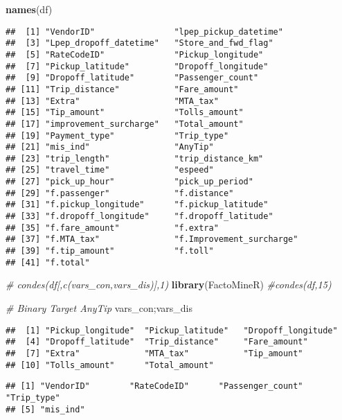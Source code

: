\documentclass[]{article}
\newenvironment{Shaded}{\begin{snugshade}}{\end{snugshade}}
\newcommand{\KeywordTok}[1]{\textcolor[rgb]{0.13,0.29,0.53}{\textbf{{#1}}}}
\newcommand{\CommentTok}[1]{\textcolor[rgb]{0.56,0.35,0.01}{\textit{{#1}}}}
\newcommand{\NormalTok}[1]{{#1}}
\begin{document}
\begin{Shaded}
\begin{Highlighting}[]
\KeywordTok{names}\NormalTok{(df)}
\end{Highlighting}
\end{Shaded}

\begin{verbatim}
##  [1] "VendorID"                "lpep_pickup_datetime"   
##  [3] "Lpep_dropoff_datetime"   "Store_and_fwd_flag"     
##  [5] "RateCodeID"              "Pickup_longitude"       
##  [7] "Pickup_latitude"         "Dropoff_longitude"      
##  [9] "Dropoff_latitude"        "Passenger_count"        
## [11] "Trip_distance"           "Fare_amount"            
## [13] "Extra"                   "MTA_tax"                
## [15] "Tip_amount"              "Tolls_amount"           
## [17] "improvement_surcharge"   "Total_amount"           
## [19] "Payment_type"            "Trip_type"              
## [21] "mis_ind"                 "AnyTip"                 
## [23] "trip_length"             "trip_distance_km"       
## [25] "travel_time"             "espeed"                 
## [27] "pick_up_hour"            "pick_up_period"         
## [29] "f.passenger"             "f.distance"             
## [31] "f.pickup_longitude"      "f.pickup_latitude"      
## [33] "f.dropoff_longitude"     "f.dropoff_latitude"     
## [35] "f.fare_amount"           "f.extra"                
## [37] "f.MTA_tax"               "f.Improvement_surcharge"
## [39] "f.tip_amount"            "f.toll"                 
## [41] "f.total"
\end{verbatim}

\begin{Shaded}
\begin{Highlighting}[]
\CommentTok{# condes(df[,c(vars_con,vars_dis)],1)}
\KeywordTok{library}\NormalTok{(FactoMineR)}
\CommentTok{#condes(df,15)}

\CommentTok{# Binary Target AnyTip}
\NormalTok{vars_con;vars_dis}
\end{Highlighting}
\end{Shaded}

\begin{verbatim}
##  [1] "Pickup_longitude"  "Pickup_latitude"   "Dropoff_longitude"
##  [4] "Dropoff_latitude"  "Trip_distance"     "Fare_amount"      
##  [7] "Extra"             "MTA_tax"           "Tip_amount"       
## [10] "Tolls_amount"      "Total_amount"
\end{verbatim}

\begin{verbatim}
## [1] "VendorID"        "RateCodeID"      "Passenger_count" "Trip_type"      
## [5] "mis_ind"
\end{verbatim}
\end{document}
